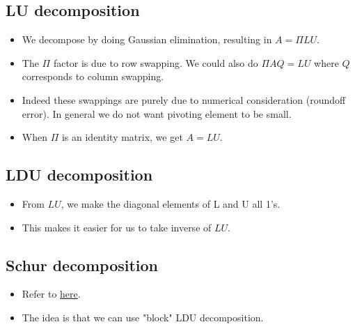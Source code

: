 \documentclass[11pt,reqno]{amsart}
\theoremstyle{remark}
\begin{document}
\subsection{LU decomposition}
\begin{itemize}
\item We decompose by doing Gaussian elimination, resulting in $A=\Pi LU$.
\item The $\Pi$ factor is due to row swapping. We could also do $\Pi AQ=LU$ where $Q$ corresponds to column swapping.
\item Indeed these swappings are purely due to numerical consideration (roundoff error). In general we do not want pivoting element to be small.
\item When $\Pi$ is an identity matrix, we get $A=LU$.
\end{itemize}
\subsection{LDU decomposition}
\begin{itemize}
\item From $LU$, we make the diagonal elements of L and U all 1's. 
\item This makes it easier for us to take inverse of $LU$. 
\end{itemize}

\subsection{Schur decomposition}
\begin{itemize}
\item Refer to \href{https://en.wikipedia.org/wiki/Schur_complement}{here}.
\item The idea is that we can use "block" LDU decomposition.
\end{itemize}
\end{document}
